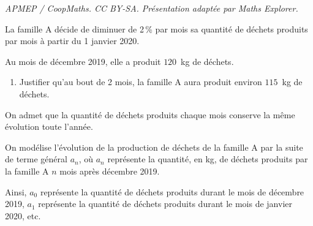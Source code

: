 \documentclass[10pt]{article}
\begin{document}
\noindent\textit{APMEP / CoopMaths. CC BY-SA. Présentation adaptée par Maths Explorer.}\par\medskip
\medskip

La famille A décide de diminuer de 2\,\% par mois sa quantité de déchets produits par mois à partir du 1 janvier 2020.

Au mois de décembre 2019, elle a produit $120$~kg de déchets.

\medskip

\begin{enumerate}
\item Justifier qu'au bout de 2 mois, la famille A aura produit environ $115$~kg de déchets.
\end{enumerate}

On admet que la quantité de déchets produits chaque mois conserve la même évolution toute l'année.

On modélise l'évolution de la production de déchets de la famille A par la suite de terme général $a_n$, où $a_n$ représente la quantité, en kg, de déchets produits par la famille A $n$ mois après décembre 2019.

Ainsi, $a_0$ représente la quantité de déchets produits durant le mois de décembre 2019, $a_1$ représente la quantité de déchets produits durant le mois de janvier 2020, etc.
\end{document}
